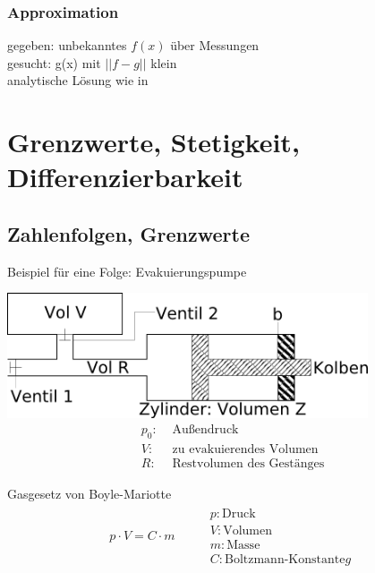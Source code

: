 \subsubsection{Approximation}

gegeben: unbekanntes $f(x)$ über Messungen \\
gesucht: g(x) mit $|| f - g ||$ klein \\
analytische Lösung wie in \pageref{interpolation} \\

\section{Grenzwerte, Stetigkeit, Differenzierbarkeit}
\subsection{Zahlenfolgen, Grenzwerte}


\begin{minipage}{1\textwidth}
Beispiel für eine Folge: Evakuierungspumpe
\begin{center}
\includegraphics[width=0.8\textwidth]{evakuierungspumpe.png}
\begin{align*}
p_0: &\text{ Außendruck} \\
V: &\text{ zu evakuierendes Volumen} \\
R: &\text{ Restvolumen des Gestänges}
\end{align*}
\end{center}
\end{minipage}

\begin{theorem} Gasgesetz von Boyle-Mariotte
\begin{align*}
p \cdot V = C \cdot m &&
\begin{aligned}
&p: \text{Druck} \\
&V: \text{Volumen} \\
&m: \text{Masse} \\
&C: \text{Boltzmann-Konstante}g
\end{aligned}
\end{align*}
\end{theorem}

